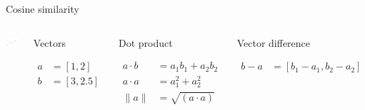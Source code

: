 \documentclass[
  10pt,
  ignorenonframetext,
  x11names, dvipsnames, bibspacing,natbib, table]{beamer}
\begin{document}
\begin{frame}{Cosine similarity}
\protect\hypertarget{cosine-similarity-1}{}
\begin{columns}
    

\begin{center}\includegraphics[width=1.15\linewidth]{presentationBoston_files/figure-beamer/cosine2-1} \end{center}



\footnotesize 


\begin{block}{Vectors}

\begin{align*}
a  & = [1,2]\\
b  &= [3,2.5]
\end{align*}

\end{block}


\begin{block}{Dot product}

\begin{align*}
a \cdot b & = a_1 b_1 + a_2 b_2\\
a \cdot a & = a_1^2 + a_2 ^ 2 \\
\lVert a\rVert & = \sqrt{(a \cdot a)}
\end{align*}

\end{block}


\begin{block}{Vector difference}

\begin{align*}
b - a & = [b_1- a_1, b_2 - a_2 ]
\end{align*}

\end{block}

\end{columns}
\end{frame}
\end{document}
